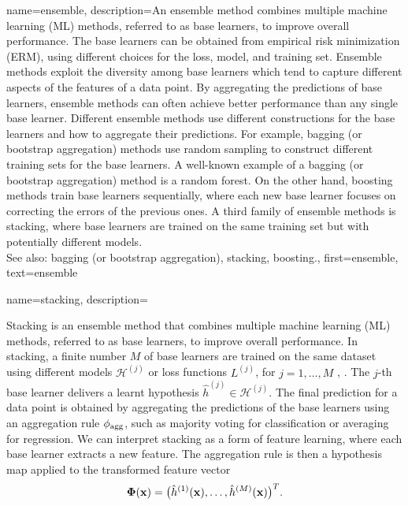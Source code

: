 {
{name={ensemble}, 
	description={An ensemble method combines multiple 
		machine learning (ML) methods, referred to as base learners, to improve overall performance. 
		The base learners can be obtained from empirical risk minimization (ERM), using different choices for 
	 	the loss, model, and training set. Ensemble methods exploit the 
	 	diversity among base learners which tend to capture different aspects of the 
		features of a data point. By aggregating the predictions of 
		base learners, ensemble methods can often achieve better performance than any 
		single base learner. Different ensemble methods use different constructions for 
		the base learners and how to aggregate their predictions. For example, 
		bagging (or bootstrap aggregation) methods use random sampling to construct different training sets 
		for the base learners. A well-known example of a bagging (or bootstrap aggregation) method is a 
		random forest. On the other hand, boosting methods train base learners 
		sequentially, where each new base learner focuses on correcting the errors of the 
		previous ones. A third family of ensemble methods is stacking, where base learners 
		are trained on the same training set but with potentially different models. 
		\\
	 	See also: bagging (or bootstrap aggregation), stacking, boosting.},
	 first={ensemble},
	 text={ensemble} 
}

{name={stacking}, 
	description={Stacking is an ensemble method that combines multiple 
		machine learning (ML) methods, referred to as base learners, to improve overall performance. 
		In stacking, a finite number $M$ of base learners are trained on the 
		same dataset using different models $\mathcal{H}^{(j)}$ 
		or loss functions $L^{(j)}$, 
        for $j=1,\ldots,M$ \cite[Ch. 8.8]{hastie01statisticallearning},
		\cite{WOLPERT1992241,ZhouEnsemble2012}. 
		The $j$-th base learner delivers a learnt hypothesis 
		$\widehat{h}^{(j)} \in \mathcal{H}^{(j)}$. 
		The final prediction for a data point is obtained by aggregating the 
		predictions of the base learners using an aggregation rule $\phi_{\rm agg}$, 
		such as majority voting for classification or averaging for regression. 
		We can interpret stacking as a form of feature learning, where each base learner 
		extracts a new feature. The aggregation rule is then 
		a hypothesis map applied to the transformed feature vector 
		$${\bf \Phi}({\bf x})= \big( \hat{h}^{(1)}({\bf x}), 
		\ldots, \hat{h}^{(M)}({\bf x}) \big)^{T}.$$
       \begin{figure}[htbp]
		\begin{center}
		\begin{tikzpicture}[
		font=\small,
		scale=1.0, transform shape,
		node distance=7mm and 10mm,
		dataset/.style={draw, rounded corners, inner sep=2pt},
		learner/.style={draw, rounded corners, minimum width=14mm, minimum height=7mm, inner sep=6pt,align=center},
		op/.style={draw, circle, inner sep=1pt},
		>=latex
		]
		

\end{tikzpicture}
\end{center}
\end{figure}}}}
